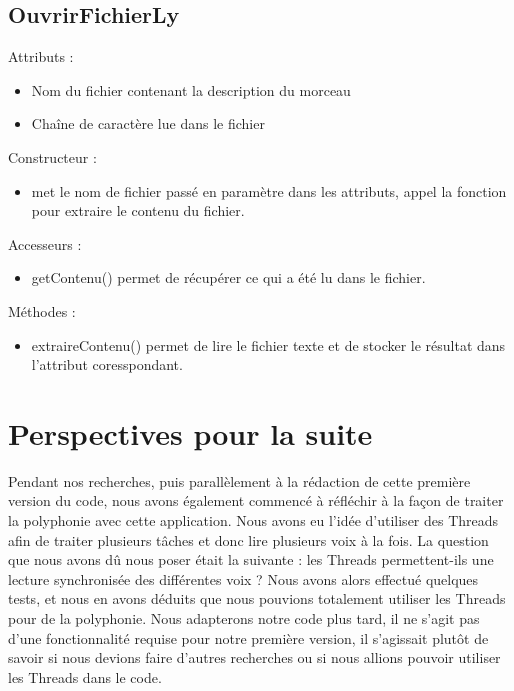 \documentclass{EPUProjetPeiP}
\begin{document}
\subsection{OuvrirFichierLy}

Attributs :
\begin{itemize}
\item Nom du fichier contenant la description du morceau
\item Chaîne de caractère lue dans le fichier
\end{itemize}


Constructeur : 
\begin{itemize}
\item met le nom de fichier passé en paramètre dans les attributs, appel la fonction pour extraire le contenu du fichier.
\end{itemize}


Accesseurs :
\begin{itemize}
\item getContenu() permet de récupérer ce qui a été lu dans le fichier.
\end{itemize}

Méthodes :
\begin{itemize}
\item extraireContenu() permet de lire le fichier texte et de stocker le résultat dans l'attribut coresspondant.
\end{itemize}

\section{Perspectives pour la suite}

Pendant nos recherches, puis parallèlement à la rédaction de cette première version du code, nous avons également commencé à réfléchir à la façon de traiter la polyphonie avec cette application. Nous avons eu l'idée d'utiliser des Threads afin de traiter plusieurs tâches et donc lire plusieurs voix à la fois. La question que nous avons dû nous poser était la suivante : les Threads permettent-ils une lecture synchronisée des différentes voix ? Nous avons alors effectué quelques tests, et nous en avons déduits que nous pouvions totalement utiliser les Threads pour de la polyphonie. Nous adapterons notre code plus tard, il ne s'agit pas d'une fonctionnalité requise pour notre première version, il s'agissait plutôt de savoir si nous devions faire d'autres recherches ou si nous allions pouvoir utiliser les Threads dans le code.
\end{document}
